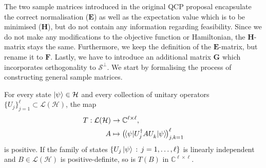 \documentclass[10pt,conference]{IEEEtran}
\newcommand*{\C}{\mathbb{C}}          %
\newcommand*{\hil}{\mathcal{H}}       %
\newcommand*{\defcolon}{\,:\,}        %
\newcommand*{\solspace}{\mathcal{S}}  %
\newcommand*{\lo}{\mathcal{L}}        %
\begin{document}
The two sample matrices introduced in the original QCP proposal encapsulate the correct normalisation ($\mathbf{E}$) as well as the expectation value which is to be minimised ($\mathbf{H}$), but do not contain any information regarding feasibility.
Since we do not make any modifications to the objective function or Hamiltonian, the $\mathbf{H}$-matrix stays the same.
Furthermore, we keep the definition of the $\mathbf{E}$-matrix, but rename it to $\mathbf{F}$.
Lastly, we have to introduce an additional matrix $\mathbf{G}$ which incorporates orthogonality to $\solspace^{\perp}$.
We start by formalising the process of constructing general sample matrices.
\begin{lemma}\label{lemma:ConstructingSampleMatricesIsCompletelyPositive}
    For every state $\ket{\psi} \in \hil$ and every collection of unitary operators $\{U_{j}\}_{j = 1}^{\ell} \subset \lo(\hil)$, the map
    \begin{align}
        \begin{split}
            T : \lo(\hil) &\rightarrow \C^{\ell \times \ell}, \\
            A &\mapsto \big(\hspace*{-3pt}\braket{\psi | U_{j}^{\dagger} A U_{k}^{\vphantom{\dagger}} | \psi}\hspace*{-3pt}\big)_{j, k = 1}^{\ell}
        \end{split}
    \end{align}
    is positive.
    If the family of states $\{U_{j} \ket{\psi} \defcolon j = 1, \ldots, \ell\}$ is linearly independent and $B \in \lo(\hil)$ is positive-definite, so is $T(B)$ in $\C^{\ell \times \ell}$.
\end{lemma}
\end{document}
